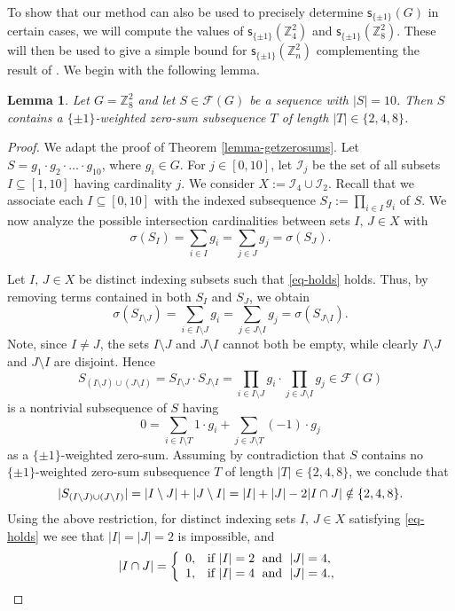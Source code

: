 \documentclass[11pt,reqno]{amsart}
\numberwithin{equation}{section}
\newtheorem{Lemma} [Theorem] {Lemma}
\theoremstyle{definition}
\numberwithin{equation}{section}
\begin{document}
\medskip

To show that our method can also be used to precisely determine $\mathsf s_{\{\pm 1\}}(G)$ in certain cases,
we will compute the values of $\mathsf s_{\{\pm 1\}}({\mathbb Z}_4^2)$ and $\mathsf s_{\{\pm 1\}}({\mathbb Z}_8^2)$.
These will then be used to give a simple bound for
$\mathsf s_{\{\pm 1\}}({\mathbb Z}_n^2)$ complementing the result of \cite{ABPP}. We begin with the following lemma.

\begin{Lemma}\label{lem-hypgraph-case8} Let $G={\mathbb Z}_8^2$ and let $S\in {\mathcal F}(G)$ be a sequence with $|S|=10$.
Then $S$ contains a $\{\pm 1\}$-weighted zero-sum subsequence $T$ of length $|T|\in \{2,4,8\}$.
\end{Lemma}

\begin{proof}
We adapt the proof of Theorem \ref{lemma-getzerosums}. Let
$S=g_1\cdot g_2\cdot \ldots\cdot g_{10}$, where $g_i\in G$. For
$j\in [0,10]$, let $\mathcal{I}_j$ be the set of all subsets
$I\subseteq [1,10]$ having cardinality $j$. We consider
$X:=\mathcal{I}_4\cup \mathcal{I}_2$. Recall that we associate each
$I\subseteq [0,10]$ with the indexed subsequence $S_I:=\prod_{i\in
I}g_i$ of $S$.  We now analyze the possible intersection
cardinalities between sets $I,\,J\in X$ with
\begin{equation}\label{eq-holds}\sigma(S_I)={\sum_{{i\in I}}}g_i={\sum_{{j\in
J}}}g_j=\sigma(S_J).\end{equation}

Let $I,\,J\in X$ be distinct indexing subsets such that \eqref{eq-holds} holds. Thus, by removing terms contained in both
$S_I$ and $S_J$, we obtain $$\sigma(S_{I\setminus J})
={\sum_{{i\in I\setminus J}}}g_i={\sum_{{j\in J\setminus I}}}g_j=\sigma(S_{J\setminus I}).$$
 Note, since $I\neq J$, the sets $I\setminus J$ and $J\setminus I$ cannot both be empty,
 while clearly  $I\setminus J$ and $J\setminus I$ are disjoint.
 Hence $$S_{(I\setminus J)\cup (J\setminus I)}=S_{I\setminus J}\cdot S_{J\setminus I}
 =\prod_{i\in I\setminus J}g_i\cdot\prod_{j\in J\setminus I}g_j\in {\mathcal F}(G)$$ is a nontrivial subsequence of $S$ having
 $$0={\sum_{{i\in I\setminus T}}}1\cdot g_i+{\sum_{{j\in J\setminus T}}}(-1)\cdot g_j$$ as a $\{\pm 1\}$-weighted zero-sum.
 Assuming by contradiction that
 $S$ contains no $\{\pm 1\}$-weighted zero-sum subsequence $T$ of length $|T|\in \{2,4,8\}$,
 we conclude that \begin{equation}|S_{(I\setminus J)\cup (J\setminus I)}|=|I\setminus J|+|J\setminus I|=|I|+|J|-2|I\cap J|\notin
 \{2,4,8\}.{\nonumber}\end{equation}
 Using the above restriction, for distinct indexing sets $I,\,J\in X$ satisfying
 \eqref{eq-holds}
 we see that $|I|=|J|=2$ is impossible, and
 \begin{equation}\label{card-restric-transfred} |I\cap J|
=\left\{
   \begin{array}{ll}
     0, & \hbox{if } |I|=2 {\;\mbox{ and } \;} |J|=4,\\
     1, & \hbox{if } |I|=4{\;\mbox{ and } \;} |J|=4.,
   \end{array}
 \right.\end{equation}


\end{proof}
\end{document}
